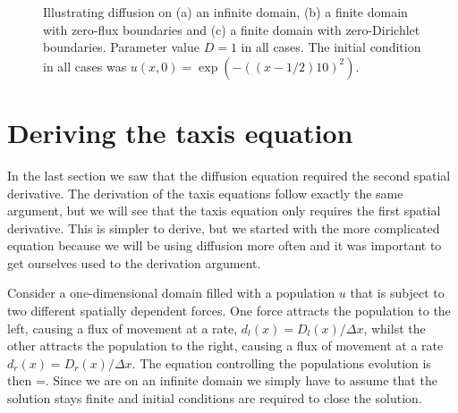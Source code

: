 \begin{figure}[!!!h!!!tb]
\caption{Illustrating diffusion on (a) an infinite domain, (b) a finite domain with zero-flux boundaries and (c) a finite domain with zero-Dirichlet boundaries. Parameter value $D=1$ in all cases. The initial condition in all cases was $u(x,0) = \exp(-((x-1/2)10)^2)$.\label{Diffusion_images}}
\end{figure}
\section{Deriving the taxis equation}
In the last section we saw that the diffusion equation required the second spatial derivative. The derivation of the taxis equations follow exactly the same argument, but we will see that the taxis equation only requires the first spatial derivative. This is simpler to derive, but we started with the more complicated equation because we will be using diffusion more often and it was important to get ourselves used to the derivation argument.
\begin{thm}
Consider a one-dimensional domain filled with a population $u$ that is subject to two different spatially dependent forces. One force attracts the population to the left, causing a flux of movement at a rate, $d_l(x)=D_l(x)/\Delta x$, whilst the other attracts the population to the right, causing a flux of movement at a rate $d_r(x)=D_r(x)/\Delta x$. The equation controlling the populations evolution is then
\bb
{}=.
\ee
Since we are on an infinite domain we simply have to assume that the solution stays finite and initial conditions are required to close the solution.
\end{thm}
